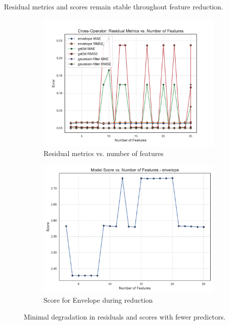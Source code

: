 Residual metrics and scores remain stable throughout feature reduction.

\begin{figure}[htbp]
    \centering
    \begin{subfigure}[t]{0.49\textwidth}
        \includegraphics[width=\textwidth]{assets/images/05/residual_metrics_by_number_of_features}
        \caption{Residual metrics vs. number of features}
    \end{subfigure}
    \hfill
    \begin{subfigure}[t]{0.49\textwidth}
        \includegraphics[width=\textwidth]{assets/images/05/score_by_number_of_features_envelope}
        \caption{Score for Envelope during reduction}
    \end{subfigure}
    \caption{Minimal degradation in residuals and scores with fewer predictors.}
    \label{fig:feature_selection_overview_part2}
\end{figure}

